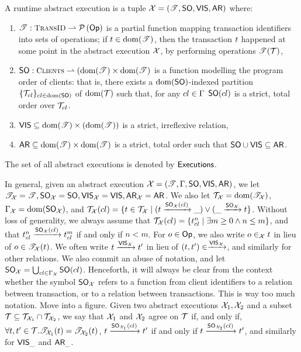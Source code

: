 \begin{definition}
A runtime abstract execution is a tuple $\mathcal{X} = (\mathscr{T}, {\sf{SO}}, {\mathsf{VIS}}, {\sf{AR}})$ where: 
\begin{enumerate}
\item $\TtoOp{T} : \TransID \rightharpoonup \powerset{\Op}$ is a partial function mapping transaction 
identifiers into sets of operations; if $t \in \operatorname{dom}(\mathscr{T})$, then the transaction $t$ happened 
at some point in the abstract execution ${\mathcal{X}}$, by performing operations $\mathscr{T}(\mathcal{T})$, 
\item $\PO: \tidset \rightharpoonup (\dom(\TtoOp{T}) \times \dom(\TtoOp{T})$ is a function modelling the 
program order of clients: that is, there exists a $\operatorname{dom}({\sf{SO}})$-indexed partition $\{\mathcal{T}_{cl}\}_{cl \in \operatorname{dom}({\sf{SO}})}$ of 
$\operatorname{dom}(\mathscr{\mathcal{T}})$ such that, for any $cl \in \Gamma$ ${\sf{SO}}(cl)$ is a strict, total order over $\mathcal{T}_{cl}$.
\item ${\mathsf{VIS}} \subseteq \operatorname{dom}(\mathscr{T}) \times (\operatorname{dom}(\mathscr{T}))$ is a strict, irreflexive relation, 
\item ${\sf{AR}} \subseteq \operatorname{dom}(\mathscr{T}) \times \operatorname{dom}(\mathscr{T})$ is a strict, total order such that ${\sf{SO}} \cup {\mathsf{VIS}} \subseteq {\sf{AR}}$.
\end{enumerate}

The set of all abstract executions is denoted by ${\mathsf{Executions}}$.
\end{definition}
In general, given an abstract execution ${\mathcal{X}} = (\mathscr{T}, \Gamma, {\sf{SO}}, {\mathsf{VIS}}, {\sf{AR}})$, we let ${\mathscr{T}}_{\mathcal{X}} = \mathscr{T}, 
 {\sf{SO}}_{\mathcal{X}} = {\sf{SO}}, {{\mathsf{VIS}}}_{\mathcal{X}} = {\mathsf{VIS}}, {\sf{AR}}_{\mathcal{X}} = {\sf{AR}}$. We also let $\mathcal{T}_{\mathcal{X}} = \operatorname{dom}(\mathscr{T}_{\mathcal{X}})$, 
 $\Gamma_{\mathcal{X}} = \operatorname{dom}({\sf{SO}}_{\mathcal{X}})$, and $\mathcal{T}_{\mathcal{X}}(cl) = \{t \in \mathcal{T}_{\mathcal{X}} \mid (t \xrightarrow{{\sf{SO}}_{\mathcal{X}}(cl)} \_) 
 \vee (\_ \xrightarrow{{\sf{SO}}_{\mathcal{X}}} t \}$. Without loss of generality, we always assume that $\mathcal{T}_{\mathcal{X}}(cl) = \{ t_{cl}^{n} \mid 
 \exists m \geq 0 \wedge n \leq m \}$, and that $t_{cl}^{n} \xrightarrow{{\sf{SO}}_{\mathcal{X}}(cl)} t_{cl}^{m}$ if and 
 only if $n < m$.
 For $o \in \mathsf{Op}$, we also write $o \in_{{\mathcal{X}}} t$ in lieu of $o \in \mathscr{T}_{\mathcal{X}}(t)$.
We often write $t \xrightarrow{{\mathsf{VIS}}_{{\mathcal{X}}}} t'$ in lieu of $(t, t') \in \xrightarrow{{\mathsf{VIS}}_{{\mathcal{X}}}}$, 
and similarly for other relations. We also commit an abuse of notation, and let ${\sf{SO}}_{{\mathcal{X}}} = 
\bigcup_{cl \in \Gamma_{\mathcal{X}}} {\sf{SO}}(cl)$. Henceforth, it will always be clear from the context 
whether the symbol ${\sf{SO}}_{\mathcal{X}}$ refers to a function from client identifiers to a relation between transaction, or to a relation
between transactions. 
\ac{This is way too much notation. Move into a figure.}
Given two abstract executions $\mathcal{X}_1, \mathcal{X}_2$ and a subset $\mathcal{T} \subseteq \mathcal{T}_{\mathcal{X}_1} \cap \mathcal{T}_{\mathcal{X}_2}$, 
we say that $\mathcal{X}_1$ and $\mathcal{X}_2$ agree on $\mathcal{T}$ if, and only if, $\forall t,t' \in \mathcal{T}. \mathscr{T}_{\mathcal{X}_1}(t) = 
\mathscr{T}_{\mathcal{X}_2}(t)$, $t \xrightarrow{{\sf{SO}}_{\mathcal{X}_1}(cl)} t'$ if and only if $t \xrightarrow{{\sf{SO}}_{\mathcal{X}_2}(cl)} 
t'$, and similarly for ${\mathsf{VIS}}_{\_}$ and ${\sf{AR}}_{\_}$.

